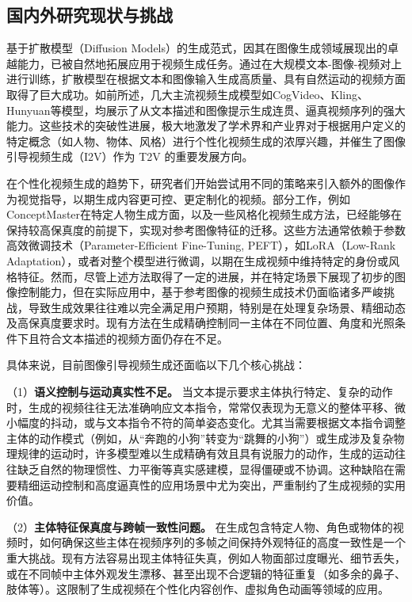 \subsection{国内外研究现状与挑战}

基于扩散模型（Diffusion Models）\cite{ho2020denoising,song2020denoising,esser2024scaling}的生成范式，因其在图像生成领域展现出的卓越能力，已被自然地拓展应用于视频生成任务。通过在大规模文本-图像-视频对上进行训练，扩散模型在根据文本和图像输入生成高质量、具有自然运动的视频方面取得了巨大成功。如前所述，几大主流视频生成模型如CogVideo\cite{yang2024cogvideox}、Kling\cite{kuaishou2024klingai}、Hunyuan\cite{sun2024hunyuan}等模型，均展示了从文本描述和图像提示生成连贯、逼真视频序列的强大能力。这些技术的突破性进展，极大地激发了学术界和产业界对于根据用户定义的特定概念（如人物、物体、风格）进行个性化视频生成的浓厚兴趣，并催生了图像引导视频生成（I2V）作为 T2V 的重要发展方向。

在个性化视频生成的趋势下，研究者们开始尝试用不同的策略来引入额外的图像作为视觉指导，以期生成内容更可控、更定制化的视频。部分工作，例如ConceptMaster\cite{huang2025conceptmaster}在特定人物生成方面，以及一些风格化视频生成方法\cite{huang2024style}，已经能够在保持较高保真度的前提下，实现对参考图像特征的迁移。这些方法通常依赖于参数高效微调技术（Parameter-Efficient Fine-Tuning, PEFT），如LoRA（Low-Rank Adaptation），或者对整个模型进行微调，以期在生成视频中维持特定的身份或风格特征。然而，尽管上述方法取得了一定的进展，并在特定场景下展现了初步的图像控制能力，但在实际应用中，基于参考图像的视频生成技术仍面临诸多严峻挑战，导致生成效果往往难以完全满足用户预期，特别是在处理复杂场景、精细动态及高保真度要求时。现有方法\cite{kumari2023multi,ruiz2023dreambooth,wei2024dreamvideo,chen2023videodreamer,zhang2024attention,blattmann2023stable}在生成精确控制同一主体在不同位置、角度和光照条件下且符合文本描述的视频方面仍存在不足。

具体来说，目前图像引导视频生成还面临以下几个核心挑战：

（1）\textbf{语义控制与运动真实性不足。} 当文本提示要求主体执行特定、复杂的动作时，生成的视频往往无法准确响应文本指令，常常仅表现为无意义的整体平移、微小幅度的抖动，或与文本指令不符的简单姿态变化。尤其当需要根据文本指令调整主体的动作模式（例如，从“奔跑的小狗”转变为“跳舞的小狗”）或生成涉及复杂物理规律的运动时，许多模型难以生成精确有效且具有说服力的动作，生成的运动往往缺乏自然的物理惯性、力平衡等真实感建模，显得僵硬或不协调。这种缺陷在需要精细运动控制和高度逼真性的应用场景中尤为突出，严重制约了生成视频的实用价值。

（2）\textbf{主体特征保真度与跨帧一致性问题。} 在生成包含特定人物、角色或物体的视频时，如何确保这些主体在视频序列的多帧之间保持外观特征的高度一致性是一个重大挑战。现有方法容易出现主体特征失真，例如人物面部过度曝光、细节丢失，或在不同帧中主体外观发生漂移、甚至出现不合逻辑的特征重复（如多余的鼻子、肢体等）。这限制了生成视频在个性化内容创作、虚拟角色动画等领域的应用。


